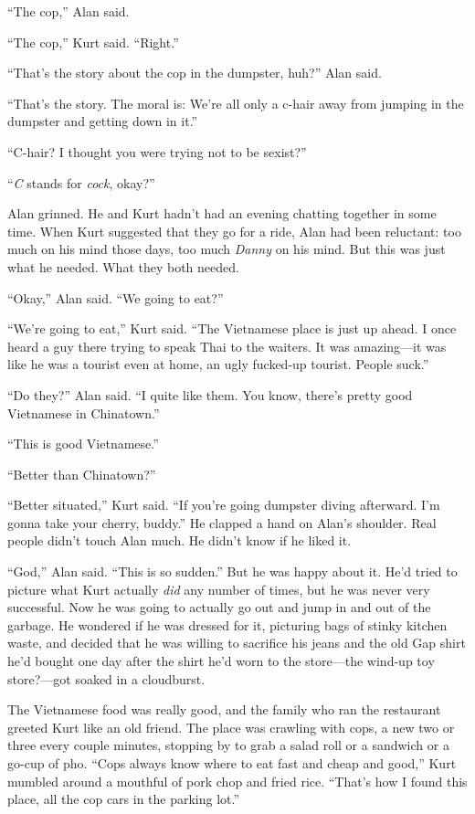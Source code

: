 ``The cop,'' Alan said.

``The cop,'' Kurt said.  ``Right.''

``That's the story about the cop in the dumpster, huh?'' Alan said.

``That's the story.  The moral is:  We're all only a c-hair away from
jumping in the dumpster and getting down in it.''

``C-hair?  I thought you were trying not to be sexist?''

``\textit{C} stands for \textit{cock}, okay?''

Alan grinned.  He and Kurt hadn't had an evening chatting together in
some time.  When Kurt suggested that they go for a ride, Alan had been
reluctant:  too much on his mind those days, too much \textit{Danny}
on his mind.  But this was just what he needed.  What they both
needed.

``Okay,'' Alan said.  ``We going to eat?''

``We're going to eat,'' Kurt said.  ``The Vietnamese place is just up
ahead.  I once heard a guy there trying to speak Thai to the waiters. 
It was amazing---it was like he was a tourist even at home, an ugly
fucked-up tourist.  People suck.''

``Do they?'' Alan said.  ``I quite like them.  You know, there's
pretty good Vietnamese in Chinatown.''

``This is good Vietnamese.''

``Better than Chinatown?''

``Better situated,'' Kurt said.  ``If you're going dumpster diving
afterward.  I'm gonna take your cherry, buddy.'' He clapped a hand on
Alan's shoulder.  Real people didn't touch Alan much.  He didn't know
if he liked it.

``God,'' Alan said.  ``This is so sudden.'' But he was happy about it. 
He'd tried to picture what Kurt actually \textit{did} any number of
times, but he was never very successful.  Now he was going to actually
go out and jump in and out of the garbage.  He wondered if he was
dressed for it, picturing bags of stinky kitchen waste, and decided
that he was willing to sacrifice his jeans and the old Gap shirt he'd
bought one day after the shirt he'd worn to the store---the wind-up
toy store?---got soaked in a cloudburst.

The Vietnamese food was really good, and the family who ran the
restaurant greeted Kurt like an old friend.  The place was crawling
with cops, a new two or three every couple minutes, stopping by to
grab a salad roll or a sandwich or a go-cup of pho.  ``Cops always
know where to eat fast and cheap and good,'' Kurt mumbled around a
mouthful of pork chop and fried rice.  ``That's how I found this
place, all the cop cars in the parking lot.''


